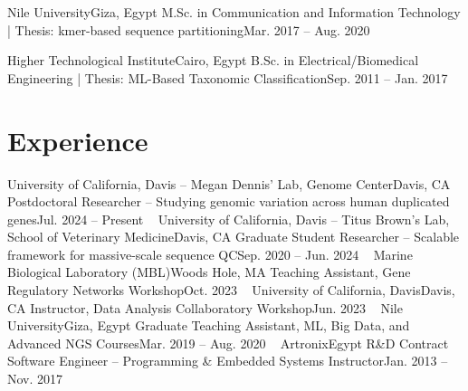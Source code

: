 \documentclass[letterpaper,11pt]{article}
\begin{document}
    \resumeSubheading
      {Nile University}{Giza, Egypt}
      {M.Sc. in Communication and Information Technology | Thesis: kmer-based sequence partitioning}{Mar. 2017 -- Aug. 2020}

    \resumeSubheading
      {Higher Technological Institute}{Cairo, Egypt}
      {B.Sc. in Electrical/Biomedical Engineering | Thesis: ML-Based Taxonomic Classification}{Sep. 2011 -- Jan. 2017}
  \resumeSubHeadingListEnd

\section{Experience}
\resumeSubHeadingListStart

  \resumeSubheading
    {University of California, Davis -- Megan Dennis' Lab, Genome Center}{Davis, CA}
    {Postdoctoral Researcher – Studying genomic variation across human duplicated genes}{Jul. 2024 -- Present}
\
  \resumeSubheading
    {University of California, Davis -- Titus Brown's Lab, School of Veterinary Medicine}{Davis, CA}
    {Graduate Student Researcher – Scalable framework for massive-scale sequence QC}{Sep. 2020 -- Jun. 2024}
\
  \resumeSubheading
    {Marine Biological Laboratory (MBL)}{Woods Hole, MA}
    {Teaching Assistant, Gene Regulatory Networks Workshop}{Oct. 2023}
\
  \resumeSubheading
    {University of California, Davis}{Davis, CA}
    {Instructor, Data Analysis Collaboratory Workshop}{Jun. 2023}
\
  \resumeSubheading
    {Nile University}{Giza, Egypt}
    {Graduate Teaching Assistant, ML, Big Data, and Advanced NGS Courses}{Mar. 2019 -- Aug. 2020}
\
  \resumeSubheading
    {Artronix}{Egypt}
    {R\&D Contract Software Engineer – Programming \& Embedded Systems Instructor}{Jan. 2013 -- Nov. 2017}

\resumeSubHeadingListEnd

\end{document}
